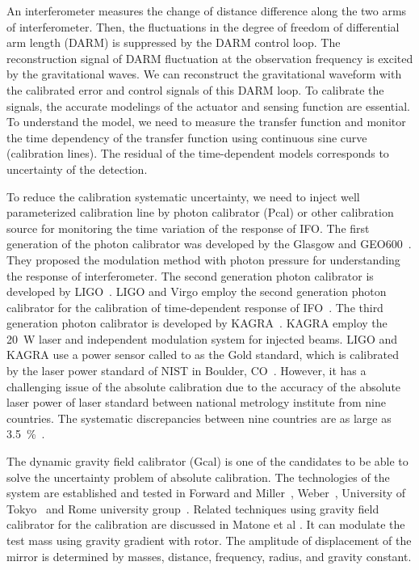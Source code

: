 \documentclass[A4]{spie}  %
\begin{document}

An interferometer measures the change of distance difference along the two arms of interferometer. Then, the fluctuations in the degree of freedom of differential arm length (DARM) is suppressed by the DARM control loop. The reconstruction signal of DARM fluctuation at the observation frequency is excited by the gravitational waves. We can reconstruct the gravitational waveform with the calibrated error and control signals of this DARM loop. To calibrate the signals, the accurate modelings of the actuator and sensing function are essential. To understand the model, we need to measure the transfer function and monitor the time dependency of the transfer function using continuous sine curve (calibration lines). The residual of the time-dependent models corresponds to uncertainty of the detection.

To reduce the calibration systematic uncertainty, we need to inject well parameterized calibration line by photon calibrator (Pcal) or other calibration source for monitoring the time variation of the response of IFO. The first generation of the photon calibrator was developed by the Glasgow and GEO600~\cite{CLUBLEY200185,MOSSAVI20061}. They proposed the modulation method with photon pressure for understanding the response of interferometer. The second generation photon calibrator is developed by LIGO~\cite{doi:10.1063/1.4967303,0264-9381-27-8-084024,0264-9381-26-24-245011,0264-9381-32-2-024001}. LIGO and Virgo employ the second generation photon calibrator for the calibration of time-dependent response of IFO~\cite{0264-9381-32-2-024001}. The third generation photon calibrator is developed by KAGRA~\cite{KAGRA_Pcal}. KAGRA employ the 20~W laser and independent modulation system for injected beams. LIGO and KAGRA use a power sensor called to as the Gold standard, which is calibrated by the laser power standard of NIST in Boulder, CO~\cite{taylor:1994:GEEU}. However, it has a challenging issue of the absolute calibration due to the accuracy of the absolute laser power of laser standard between national metrology institute from nine countries. The 
systematic discrepancies between nine countries are as large as 3.5~\%~\cite{EUROMET}.

The dynamic gravity field calibrator (Gcal) is one of the candidates to be able to solve the uncertainty problem of absolute calibration. The technologies of the system are established and tested in Forward and Miller~\cite{doi:10.1063/1.1709366}, Weber~\cite{PhysRevLett.18.795,PhysRev.167.1145}, University of Tokyo~\cite{Hirakawa,1347-4065-19-3-L123,1347-4065-20-7-L498,PhysRevD.26.729,PhysRevD.32.342} and Rome university group~\cite{Astone1991}. Related techniques using gravity field calibrator for the calibration are discussed in Matone et al \cite{0264-9381-24-9-005}. It can modulate the test mass using gravity gradient with rotor. The amplitude of displacement of the mirror is determined by masses, distance, frequency, radius, and gravity constant. 
\end{document}
